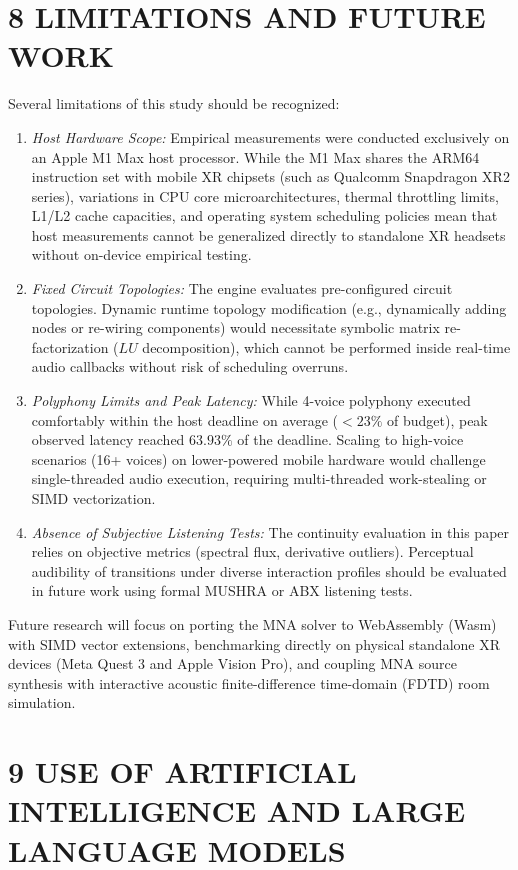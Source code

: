 \documentclass[fleqn,draft]{jaes}
\begin{document}
\section{8 LIMITATIONS AND FUTURE WORK}

Several limitations of this study should be recognized:
\begin{enumerate}
\item \textit{Host Hardware Scope:} Empirical measurements were conducted exclusively on an Apple M1 Max host processor. While the M1 Max shares the ARM64 instruction set with mobile XR chipsets (such as Qualcomm Snapdragon XR2 series), variations in CPU core microarchitectures, thermal throttling limits, L1/L2 cache capacities, and operating system scheduling policies mean that host measurements cannot be generalized directly to standalone XR headsets without on-device empirical testing.
\item \textit{Fixed Circuit Topologies:} The engine evaluates pre-configured circuit topologies. Dynamic runtime topology modification (e.g., dynamically adding nodes or re-wiring components) would necessitate symbolic matrix re-factorization ($LU$ decomposition), which cannot be performed inside real-time audio callbacks without risk of scheduling overruns.
\item \textit{Polyphony Limits and Peak Latency:} While 4-voice polyphony executed comfortably within the host deadline on average ($< 23\%$ of budget), peak observed latency reached $63.93\%$ of the deadline. Scaling to high-voice scenarios (16+ voices) on lower-powered mobile hardware would challenge single-threaded audio execution, requiring multi-threaded work-stealing or SIMD vectorization.
\item \textit{Absence of Subjective Listening Tests:} The continuity evaluation in this paper relies on objective metrics (spectral flux, derivative outliers). Perceptual audibility of transitions under diverse interaction profiles should be evaluated in future work using formal MUSHRA or ABX listening tests.
\end{enumerate}

Future research will focus on porting the MNA solver to WebAssembly (Wasm) with SIMD vector extensions, benchmarking directly on physical standalone XR devices (Meta Quest 3 and Apple Vision Pro), and coupling MNA source synthesis with interactive acoustic finite-difference time-domain (FDTD) room simulation.

\section{9 USE OF ARTIFICIAL INTELLIGENCE AND LARGE LANGUAGE MODELS}
\end{document}
